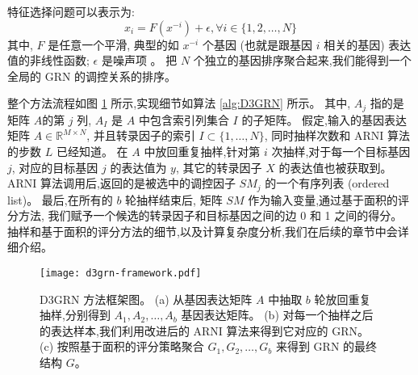 特征选择问题可以表示为:
\begin{equation}
\label{eq:fs}
x_i =  F(x^{-i}) + \epsilon , \forall i \in \{1,2,\ldots,N\}
\end{equation}
其中, $F$ 是任意一个平滑, 典型的如 $x^{-i}$ 个基因 (也就是跟基因 $i$ 相关的基因) 表达值的非线性函数; $\epsilon$ 是噪声项 \cite{huynh2010inferring,Haury2012}。
把 $N$ 个独立的基因排序聚合起来,我们能得到一个全局的 GRN 的调控关系的排序。


整个方法流程如图 \ref{d3grn} 所示,实现细节如算法 \ref{alg:D3GRN} 所示。
其中, $A_j$ 指的是矩阵 $A$的第 $j$ 列, $A_I$ 是 $A$ 中包含索引列集合 $I$ 的子矩阵。
假定,输入的基因表达矩阵 $A \in \mathbb{R}^{M \times N}$, 
并且转录因子的索引 $I \subset \{1,\ldots,N\}$, 
同时抽样次数和 ARNI 算法的步数 $L$ 已经知道。
在 $A$ 中放回重复抽样,针对第 $i$ 次抽样,对于每一个目标基因 $j$, 
对应的目标基因 $j$ 的表达值为 $y$, 
其它的转录因子 $X$ 的表达值也被获取到。
ARNI 算法调用后,返回的是被选中的调控因子 $SM_j$ 的一个有序列表 (ordered list)。
最后,在所有的 $b$ 轮抽样结束后,
矩阵 $SM$ 作为输入变量,通过基于面积的评分方法,
我们赋予一个候选的转录因子和目标基因之间的边 0 和 1 之间的得分。
抽样和基于面积的评分方法的细节,以及计算复杂度分析,我们在后续的章节中会详细介绍。
 
\begin{figure}[!htbp]
  \centering
  \texttt{[image: d3grn-framework.pdf]}
  \caption{D3GRN 方法框架图。
  (a) 从基因表达矩阵 $A$ 中抽取 $b$ 轮放回重复抽样,分别得到 $A_1,A_2,\ldots,A_{b}$ 基因表达矩阵。
  (b) 对每一个抽样之后的表达样本,我们利用改进后的 ARNI 算法来得到它对应的 GRN。
  (c) 按照基于面积的评分策略聚合 $G_1, G_2, \ldots, G_b$ 来得到 GRN 的最终结构 $G$。
  }
  \label{d3grn}
\end{figure}

